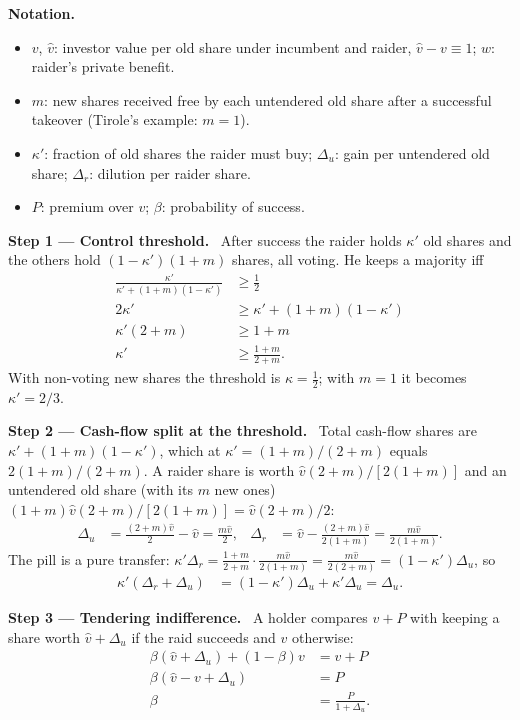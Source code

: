 \documentclass[11pt,a4paper]{article}
\newcommand{\notation}{\par\noindent\textbf{Notation.}}
\newcommand{\step}[2]{\par\medskip\noindent\textbf{Step #1 --- #2.}~}
\begin{document}
\notation
\begin{itemize}
  \item $v$, $\hat v$: investor value per old share under incumbent and raider, $\hat v-v\equiv 1$; $\hat w$: raider's private benefit.
  \item $m$: new shares received free by each untendered old share after a successful takeover (Tirole's example: $m=1$).
  \item $\kappa'$: fraction of old shares the raider must buy; $\Delta_u$: gain per untendered old share; $\Delta_r$: dilution per raider share.
  \item $P$: premium over $v$; $\beta$: probability of success.
\end{itemize}

\step{1}{Control threshold} After success the raider holds $\kappa'$ old shares and the others hold
$(1-\kappa')(1+m)$ shares, all voting. He keeps a majority iff
\begin{align}
  \frac{\kappa'}{\kappa'+(1+m)(1-\kappa')} &\ge \frac12 \nonumber\\
  2\kappa' &\ge \kappa'+(1+m)(1-\kappa') \nonumber\\
  \kappa'(2+m) &\ge 1+m \nonumber\\
  \kappa' &\ge \frac{1+m}{2+m}. \label{r9e11-k}
\end{align}
With non-voting new shares the threshold is $\kappa=\tfrac12$; with $m=1$ it becomes $\kappa'=2/3$.

\step{2}{Cash-flow split at the threshold} Total cash-flow shares are $\kappa'+(1+m)(1-\kappa')$, which
at $\kappa'=(1+m)/(2+m)$ equals $2(1+m)/(2+m)$. A raider share is worth
$\hat v(2+m)/[2(1+m)]$ and an untendered old share (with its $m$ new ones) $(1+m)\hat v(2+m)/[2(1+m)]=\hat v(2+m)/2$:
\begin{align}
  \Delta_u &= \frac{(2+m)\hat v}{2}-\hat v = \frac{m\hat v}{2}, &
  \Delta_r &= \hat v-\frac{(2+m)\hat v}{2(1+m)} = \frac{m\hat v}{2(1+m)}. \label{r9e11-D}
\end{align}
The pill is a pure transfer: $\kappa'\Delta_r=\frac{1+m}{2+m}\cdot\frac{m\hat v}{2(1+m)}=\frac{m\hat v}{2(2+m)}=(1-\kappa')\Delta_u$, so
\begin{align}
  \kappa'(\Delta_r+\Delta_u) &= (1-\kappa')\Delta_u+\kappa'\Delta_u = \Delta_u. \label{r9e11-cons}
\end{align}

\step{3}{Tendering indifference} A holder compares $v+P$ with keeping a share worth $\hat v+\Delta_u$ if the
raid succeeds and $v$ otherwise:
\begin{align}
  \beta(\hat v+\Delta_u)+(1-\beta)v &= v+P \nonumber\\
  \beta(\hat v-v+\Delta_u) &= P \nonumber\\
  \beta &= \frac{P}{1+\Delta_u}. \label{r9e11-beta}
\end{align}
\end{document}
